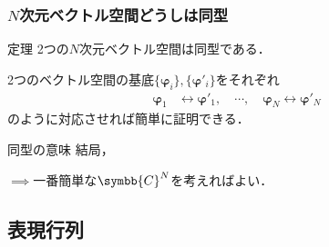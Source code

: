 \documentclass[
    10pt,
    ]{sotsu-beamer}
\begin{document}
\begin{frame}
    \frametitle{$N$次元ベクトル空間どうしは同型}

    \begin{block}{定理}
        2つの$N$次元ベクトル空間は同型である．
    \end{block}

    2つのベクトル空間の基底$\{\symbf{\varphi}_i\}, \{\symbf{\varphi}'_i\}$をそれぞれ
    \begin{align*}
        \symbf{\varphi}_1 &\leftrightarrow \symbf{\varphi}'_1, 
        \quad
        \cdots, 
        \quad
        \symbf{\varphi}_N \leftrightarrow \symbf{\varphi}'_N
    \end{align*}
    のように対応させれば簡単に証明できる．

    \pause 

    \begin{alertblock}{同型の意味}
        結局，
    \end{alertblock}

    $\implies$一番簡単な$\symbb{C}^N$を考えればよい．

\end{frame}


\subsection{表現行列}
\end{document}
